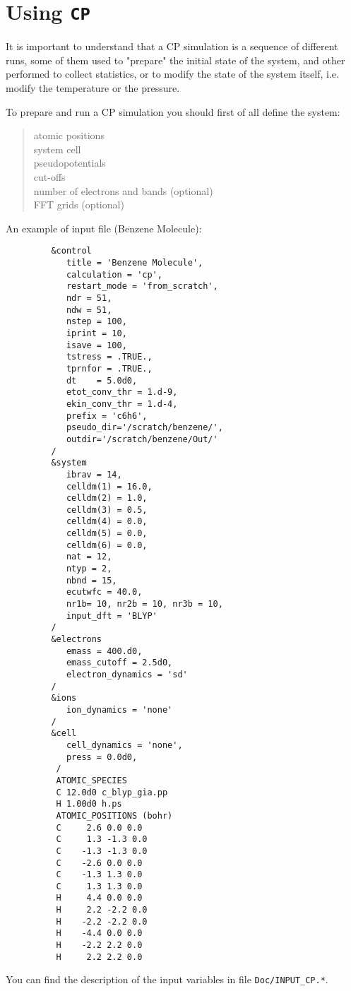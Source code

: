 \documentclass[12pt,a4paper]{article}
\def\CP{\texttt{CP}}
\begin{document}
\section{Using \CP}

It is important to understand that a CP simulation is a sequence of different 
runs, some of them used to "prepare" the initial state of the system, and 
other performed to collect statistics, or to modify the state of the system
itself, i.e. modify the temperature or the pressure.
    
To prepare and run a CP simulation you should first of all
define the system:
  \begin{quote}
    atomic positions\\
    system cell\\
    pseudopotentials\\
    cut-offs\\
    number of electrons and bands (optional)\\
    FFT grids (optional)
  \end{quote}
An example of input file (Benzene Molecule):
\begin{verbatim}
         &control
            title = 'Benzene Molecule',
            calculation = 'cp',
            restart_mode = 'from_scratch',
            ndr = 51,
            ndw = 51,
            nstep = 100,
            iprint = 10,
            isave = 100,
            tstress = .TRUE.,
            tprnfor = .TRUE.,
            dt    = 5.0d0,
            etot_conv_thr = 1.d-9,
            ekin_conv_thr = 1.d-4,
            prefix = 'c6h6',
            pseudo_dir='/scratch/benzene/',
            outdir='/scratch/benzene/Out/'
         /
         &system
            ibrav = 14,
            celldm(1) = 16.0,
            celldm(2) = 1.0,
            celldm(3) = 0.5,
            celldm(4) = 0.0,
            celldm(5) = 0.0,
            celldm(6) = 0.0,
            nat = 12,
            ntyp = 2,
            nbnd = 15,
            ecutwfc = 40.0,
            nr1b= 10, nr2b = 10, nr3b = 10,
            input_dft = 'BLYP'
         /
         &electrons
            emass = 400.d0,
            emass_cutoff = 2.5d0,
            electron_dynamics = 'sd'
         /
         &ions
            ion_dynamics = 'none'
         /
         &cell
            cell_dynamics = 'none',
            press = 0.0d0,
          /
          ATOMIC_SPECIES
          C 12.0d0 c_blyp_gia.pp
          H 1.00d0 h.ps
          ATOMIC_POSITIONS (bohr)
          C     2.6 0.0 0.0
          C     1.3 -1.3 0.0
          C    -1.3 -1.3 0.0
          C    -2.6 0.0 0.0
          C    -1.3 1.3 0.0
          C     1.3 1.3 0.0
          H     4.4 0.0 0.0
          H     2.2 -2.2 0.0
          H    -2.2 -2.2 0.0
          H    -4.4 0.0 0.0
          H    -2.2 2.2 0.0
          H     2.2 2.2 0.0
\end{verbatim} 
You can find the description of the input variables in file 
\texttt{Doc/INPUT\_CP.*}.
 
\end{document}
